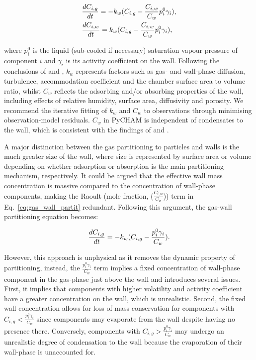 \documentclass[gmd, manuscript]{copernicus}
\begin{document}
\begin{align} \label{eq:gas_wall_partit}
	&\frac{dC_{i,g}}{dt} = -k_{w}(C_{i,g}-\frac{C_{i,w}}{C_{w}}p^{0}_{i}\gamma_{i})\rm{,}\\
	&\frac{dC_{i,w}}{dt} = k_{w}(C_{i,g}-\frac{C_{i,w}}{C_{w}}p^{0}_{i}\gamma_{i})\rm{,}
\end{align}

where $p^{0}_{i}$ is the liquid (sub-cooled if necessary) saturation vapour pressure of component $i$ and $\gamma_{i}$ is its activity coefficient on the wall.  Following the conclusions of \citet{Matsunaga2010} and \citet{Zhang2015b}, $k_{w}$ represents factors such as gas- and wall-phase diffusion, turbulence, accommodation coefficient and the chamber surface area to volume ratio, whilst $C_{w}$ reflects the adsorbing and/or absorbing properties of the wall, including effects of relative humidity, surface area, diffusivity and porosity.  We recommend the iterative fitting of $k_{w}$ and $C_{w}$ to observations through minimising observation-model residuals.  $C_{w}$ in PyCHAM is independent of condensates to the wall, which is consistent with the findings of \citet{Matsunaga2010} and \citet{Zhang2015b}.

A major distinction between the gas partitioning to particles and walls is the much greater size of the wall, where size is represented by surface area or volume depending on whether adsorption or absorption is the main partitioning mechanism, respectively.  It could be argued that the effective wall mass concentration is massive compared to the concentration of wall-phase components, making the Raoult (mole fraction, ($\frac{C_{i,w}}{C_{w}}$)) term in Eq.~\ref{eq:gas_wall_partit} redundant.  Following this argument, the gas-wall partitioning equation becomes:

\begin{equation} \label{eq:gas_wall_partit2}
\frac{dC_{i,g}}{dt} = -k_{w}(C_{i,g}-\frac{p^{0}_{i}\gamma_{i}}{C_{w}})\rm{.}
\end{equation}

However, this approach is unphysical as it removes the dynamic property of partitioning, instead, the $\frac{p^{0}_{i}\gamma_{i}}{C_{w}}$ term implies a fixed concentration of wall-phase component in the gas-phase just above the wall and introduces several issues.  First, it implies that components with higher volatility and activity coefficient have a greater concentration on the wall, which is unrealistic.  Second, the fixed wall concentration allows for loss of mass conservation for components with $C_{i,g}<\frac{p^{0}_{i}\gamma_{i}}{C_{w}}$ since components may evaporate from the wall despite having no presence there.  Conversely, components with  $C_{i,g}>\frac{p^{0}_{i}\gamma_{i}}{C_{w}}$ may undergo an unrealistic degree of condensation to the wall because the evaporation of their wall-phase is unaccounted for.
\end{document}
